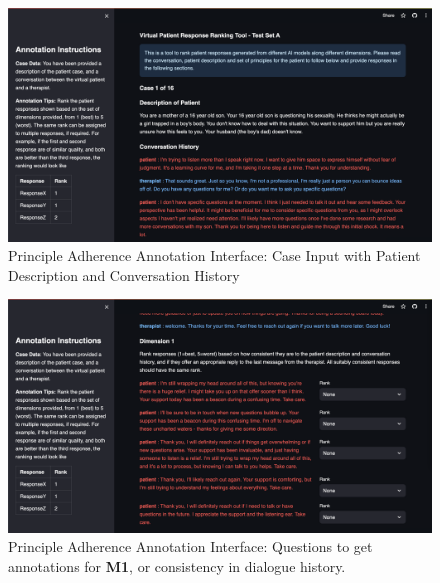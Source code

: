 \documentclass[11pt]{article}
\begin{document}
\begin{figure}
    \centering
    \includegraphics[width=\textwidth]{Study Screenshots/response-ranking-annotation-interface/caseinput.png}
    \caption{Principle Adherence Annotation Interface: Case Input with Patient Description and Conversation History}
    \label{fig:ranking-interface-caseinput}
\end{figure}

\begin{figure}
    \centering
    \includegraphics[width=\textwidth]{Study Screenshots/response-ranking-annotation-interface/dimension1.png}
    \caption{Principle Adherence Annotation Interface: Questions to get annotations for \textbf{M1}, or consistency in dialogue history.}
    \label{fig:ranking-interface-m1}
\end{figure}
\end{document}
